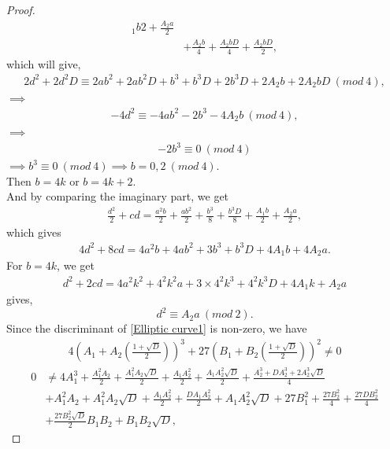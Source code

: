\documentclass[12pt,leqno]{amsart}
\newcommand{\<}{\langle}
\renewcommand{\>}{\rangle}
\theoremstyle{definition}
\numberwithin{equation}{section}
\begin{document}
\begin{proof}
\begin{align*}
{        _1b}{2}+\frac{A_2a}{2}\\&+\frac{A_2b}{4}+\frac{A_2bD}{4}+\frac{A_2bD}{2},
    \end{align*}
    which will give,\\
    \begin{align*}
        2d^2+2d^2D\equiv 2ab^2+2ab^2D+b^3+b^3D+2b^3D+2A_2b+2A_2bD~(mod~4),
    \end{align*}
    $\implies$
    \begin{align*}
         -4d^2\equiv -4ab^2-2b^3-4A_2b~(mod~4),
    \end{align*}
    $\implies$
    \begin{align*}
        -2b^3\equiv0~(mod~4)
    \end{align*}
   $\implies b^3\equiv0~(mod~4)\implies b=0,2~(mod~4)$.\\ 
   Then $b=4k$ or $b=4k+2$.\\
    And by comparing the imaginary part, we get
    \begin{align*}
        \frac{d^2}{2}+cd=\frac{a^2b}{2}+\frac{ab^2}{2}+\frac{b^3}{8}+\frac{b^3D}{8}+\frac{A_1b}{2}+\frac{A_2a}{2},
    \end{align*}
    which gives\\
    \begin{align*}
        4d^2+8cd=4a^2b+4ab^2+3b^3+b^3D+4A_1b+4A_2a.
    \end{align*}
    For $b=4k$, we get
    \begin{align*}
        d^2+2cd=4a^2k^2+4^2k^2a+3\times4^2k^3+4^2k^3D+4A_1k+A_2a
    \end{align*}
    gives,
    \begin{equation}\label{A2}
        d^2\equiv A_2a~(mod~2).
    \end{equation}
    Since the discriminant of \eqref{Elliptic curve1} is non-zero, we have
    \begin{align*}
        4\left(A_1+A_2\left(\frac{1+\sqrt{D}}{2}\right)\right)^3+27\left(B_1+B_2\left(\frac{1+\sqrt{D}}{2}\right)\right)^2\neq 0
    \end{align*}
    \begin{align*}
       0&\neq 4A_1^3+\frac{A_1^2A_2}{2}+\frac{A_1^2A_2\sqrt{D}}{2}+\frac{A_1A_2^2}{2}+\frac{A_1A_2^2\sqrt{D}}{2}+\frac{A_2^3+DA_2^3+2A_2^3\sqrt{D}}{4}\\&+A_1^2A_2+A_1^2A_2\sqrt{D}+\frac{A_1A_2^2}{2}+\frac{DA_1A_2^2}{2}+A_1A_2^2\sqrt{D}+27B_1^2+\frac{27B_2^2}{4}+\frac{27DB_2^2}{4}\\&+\frac{27B_2^2\sqrt{D}}{2}B_1B_2+B_1B_2\sqrt{D},

\end{align*}
\end{proof}
\end{document}

